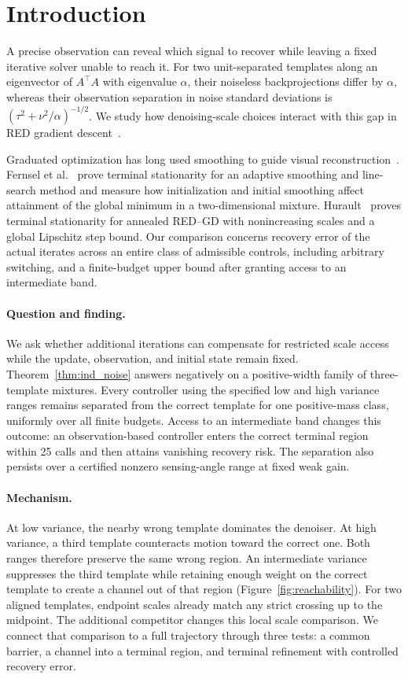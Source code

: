 \section{Introduction}
A precise observation can reveal which signal to recover while
leaving a fixed iterative solver unable to reach it.
For two unit-separated templates along an eigenvector of $A^\top A$
with eigenvalue $\alpha$, their noiseless backprojections differ by
$\alpha$, whereas their observation separation in noise standard
deviations is $(\tau^2+\nu^2/\alpha)^{-1/2}$.
We study how denoising-scale choices interact with this gap in RED
gradient descent~\cite{romano2017}.

Graduated optimization has long used smoothing to guide visual
reconstruction~\cite{blake1987,mobahi2015,hazan2016}.
Fernsel et al.~\cite{fernsel2024} prove terminal stationarity for an
adaptive smoothing and line-search method and measure how initialization
and initial smoothing affect attainment of the global minimum in a
two-dimensional mixture. Hurault~\cite{hurault2026} proves terminal
stationarity for annealed RED--GD with nonincreasing scales and a
global Lipschitz step bound. Our comparison concerns recovery error of
the actual iterates across an entire class of admissible controls,
including arbitrary switching, and a finite-budget upper bound
after granting access to an intermediate band.

\paragraph{Question and finding.}
We ask whether additional iterations can compensate for restricted
scale access while the update, observation, and initial state remain
fixed. Theorem~\ref{thm:ind_noise} answers negatively on a
positive-width family of three-template mixtures. Every controller
using the specified low and high variance ranges remains separated
from the correct template for one positive-mass class, uniformly
over all finite budgets. Access to an intermediate band changes this
outcome: an observation-based controller enters the correct terminal
region within 25 calls and then attains vanishing recovery risk.
The separation also persists over a certified nonzero sensing-angle
range at fixed weak gain.

\paragraph{Mechanism.}
At low variance, the nearby wrong template dominates the denoiser.
At high variance, a third template counteracts motion toward the
correct one. Both ranges therefore preserve the same wrong region.
An intermediate variance suppresses the third template while
retaining enough weight on the correct template to create a channel
out of that region (Figure~\ref{fig:reachability}). For two aligned
templates, endpoint scales already match any strict crossing up to
the midpoint. The additional competitor changes this local scale
comparison. We connect that comparison to a full trajectory through
three tests: a common barrier, a channel into a terminal region,
and terminal refinement with controlled recovery error.

